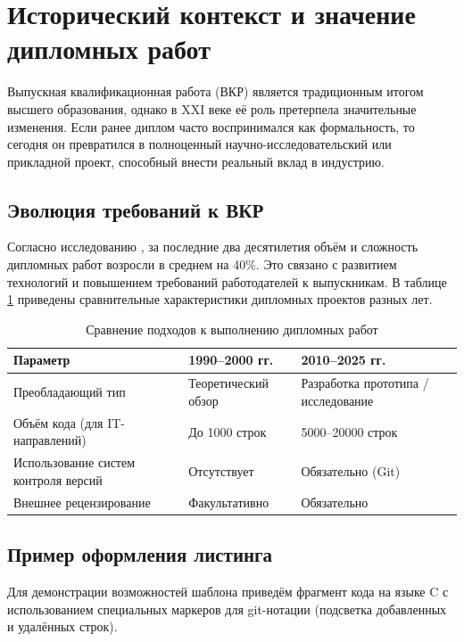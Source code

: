 \section{Исторический контекст и значение дипломных работ}
\label{sec:history}

Выпускная квалификационная работа (ВКР) является традиционным итогом высшего образования, однако в XXI веке её роль претерпела значительные изменения. Если ранее диплом часто воспринимался как формальность, то сегодня он превратился в полноценный научно-исследовательский или прикладной проект, способный внести реальный вклад в индустрию.

\subsection{Эволюция требований к ВКР}
\label{subsec:evolution}

Согласно исследованию \cite{edutrends}, за последние два десятилетия объём и сложность дипломных работ возросли в среднем на 40\%. Это связано с развитием технологий и повышением требований работодателей к выпускникам. В таблице \ref{tab:comparison} приведены сравнительные характеристики дипломных проектов разных лет.

\begin{table}[htbp]
	\centering
	\caption{Сравнение подходов к выполнению дипломных работ}
	\label{tab:comparison}
	\begin{tabular}{|p{4cm}|p{4.5cm}|p{4.5cm}|}
		\hline
		\textbf{Параметр} & \textbf{1990–2000 гг.} & \textbf{2010–2025 гг.} \\
		\hline
		Преобладающий тип & Теоретический обзор & Разработка прототипа / исследование \\
		\hline
		Объём кода (для IT-направлений) & До 1000 строк & 5000–20000 строк \\
		\hline
		Использование систем контроля версий & Отсутствует & Обязательно (Git) \\
		\hline
		Внешнее рецензирование & Факультативно & Обязательно \\
		\hline
	\end{tabular}
\end{table}

\subsection{Пример оформления листинга}
Для демонстрации возможностей шаблона приведём фрагмент кода на языке C с использованием специальных маркеров для git-нотации (подсветка добавленных и удалённых строк).

